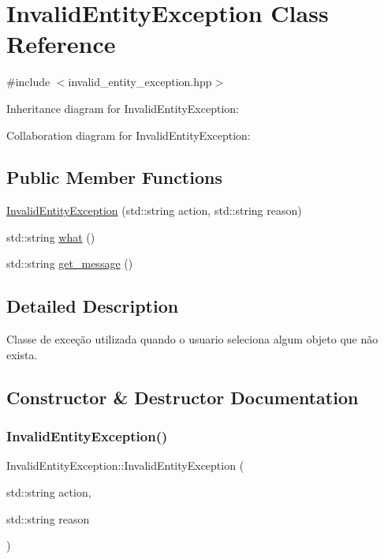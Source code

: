 \hypertarget{class_invalid_entity_exception}{}\section{Invalid\+Entity\+Exception Class Reference}
\label{class_invalid_entity_exception}


{\ttfamily \#include $<$invalid\+\_\+entity\+\_\+exception.\+hpp$>$}



Inheritance diagram for Invalid\+Entity\+Exception\+:


Collaboration diagram for Invalid\+Entity\+Exception\+:
\subsection*{Public Member Functions}
\begin{DoxyCompactItemize}
\item 
\hyperlink{class_invalid_entity_exception_ab88e48002dc63b49b06c062c824404de}{Invalid\+Entity\+Exception} (std\+::string action, std\+::string reason)
\item 
std\+::string \hyperlink{class_invalid_entity_exception_ad07a831eba2b91b23a316b02ff162320}{what} ()
\item 
std\+::string \hyperlink{class_invalid_entity_exception_a765c42ad480c5c8714761f254e86fadd}{get\+\_\+message} ()
\end{DoxyCompactItemize}


\subsection{Detailed Description}
Classe de exceção utilizada quando o usuario seleciona algum objeto que não exista. 

\subsection{Constructor \& Destructor Documentation}
\mbox{\label{class_invalid_entity_exception_ab88e48002dc63b49b06c062c824404de}} 
\subsubsection{\texorpdfstring{Invalid\+Entity\+Exception()}{InvalidEntityException()}}
{\footnotesize\ttfamily Invalid\+Entity\+Exception\+::\+Invalid\+Entity\+Exception (\begin{DoxyParamCaption}\item[{std\+::string}]{action,  }\item[{std\+::string}]{reason }\end{DoxyParamCaption})}



